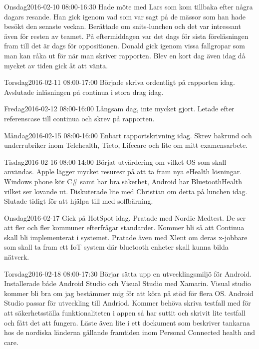 \documentclass[a4paper,oneside]{book}
\begin{document}
\begin{diary}{Onsdag}{2016-02-10 08:00-16:30}
	Hade möte med Lars som kom tillbaka efter några dagars resande. Han gick igenom vad som var sagt på de mässor som han hade besökt den senaste veckan. Berättade om snits-lunchen och det var intressant även för resten av teamet. På eftermiddagen var det dags för sista föreläsningen fram till det är dags för oppositionen. Donald gick igenom vissa fallgropar som man kan råka ut för när man skriver rapporten. Blev en kort dag även idag då mycket av tiden gick åt att vänta.
\end{diary}

\begin{diary}{Torsdag}{2016-02-11 08:00-17:00}
	Började skriva ordentligt på rapporten idag. Avslutade inläsningen på continua i stora drag idag. 
\end{diary}

\begin{diary}{Fredag}{2016-02-12 08:00-16:00}
	Långsam dag, inte mycket gjort. Letade efter referenscase till continua och skrev på rapporten.
\end{diary}
\newpage

\begin{diary}{Måndag}{2016-02-15 08:00-16:00}
	Enbart rapportskrivning idag. Skrev bakrund och underrubriker inom Telehealth, Tieto, Lifecare och lite om mitt examensarbete.
\end{diary}

\begin{diary}{Tisdag}{2016-02-16 08:00-14:00}
	Börjat utvärdering om vilket OS som skall användas. Apple lägger mycket resuresr på att ta fram nya eHealth lösningar. Windows phone kör C\# samt har bra säkerhet, Android har BluetoothHealth vilket ser lovande ut. Diskuterade lite med Christian om detta på lunchen idag. Slutade tidigt för att hjälpa till med soffbärning. 
\end{diary}

\begin{diary}{Onsdag}{2016-02-17}
	Gick på HotSpot idag. Pratade med Nordic Medtest. De ser att fler och fler kommuner efterfrågar standarder. Kommer bli så att Continua skall bli implementerat i systemet. Pratade även med Xlent om deras x-jobbare som skall ta fram ett IoT system där bluetooth enheter skall kunna bilda nätverk.
\end{diary}

\begin{diary}{Torsdag}{2016-02-18 08:00-17:30}
	Börjar sätta upp en utvecklingsmiljö för Android. Installerade både Android Studio och Visual Studio med Xamarin. Visual studio kommer bli bra om jag bestämmer mig för att köra på stöd för flera OS. Android Studio passar för utveckling till Andriod. Kommer behöva skriva testfall med för att säkerhetsställa funktionaliteten i appen så har suttit och skrivit lite testfall och fått det att fungera. Läste även lite i ett dockument som beskriver tankarna hos de nordiska länderna gällande framtiden inom Personal Connected health and care.
\end{diary}
\end{document}
